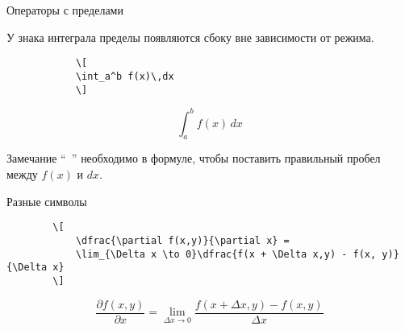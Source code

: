 \begin{frame}[fragile]{Операторы с пределами}
	\Large
	\begin{center}
		
	\end{center}
	
	\normalsize
	
	У знака интеграла пределы появляются сбоку вне зависимости от режима.
	
	
	\begin{minipage}{0.49\textwidth}
		\begin{verbatim}
			\[
			\int_a^b f(x)\,dx
			\] 
		\end{verbatim}
	\end{minipage}
	\begin{minipage}{0.49\textwidth}
		\Large
		\[
		\int_a^b f(x)\,dx
		\]
	\end{minipage}
	
	\begin{exampleblock}{Замечание}
		``\texttt{\,}'' необходимо в формуле, чтобы поставить правильный пробел между $f(x)$ и $dx$.
	\end{exampleblock}
\end{frame}

\begin{frame}[fragile]{Разные символы}
	\begin{center}
		
	\end{center}
	

	\begin{verbatim}
		\[
			\dfrac{\partial f(x,y)}{\partial x} =
			\lim_{\Delta x \to 0}\dfrac{f(x + \Delta x,y) - f(x, y)}{\Delta x}
		\] 
	\end{verbatim}

	\Large
	\[
		\dfrac{\partial f(x, y)}{\partial x} = \lim_{\Delta x\to0} \dfrac{f(x + 	\Delta x, y) - f(x, y)}{\Delta x}
	\] 
\end{frame}


